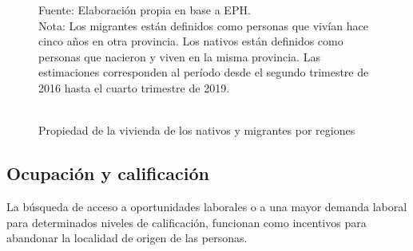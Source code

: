 \documentclass[12pt,a4paper]{article}
\begin{document}
\begin{figure}[htbp!]
\begin{center}
\caption{\\Propiedad de la vivienda de los nativos y migrantes por regiones}
\label{figure:vivienda_mig}
 
\end{center}
\begin{flushleft}
\begin{scriptsize}
Fuente: Elaboración propia en base a EPH.\\
Nota: Los migrantes están definidos como personas que vivían hace cinco años en otra provincia. Los nativos están definidos como personas que nacieron y viven en la misma provincia. Las estimaciones corresponden al período desde el segundo trimestre de 2016 hasta el cuarto trimestre de 2019.\\
\end{scriptsize}
\end{flushleft}
\end{figure}
 


% 
\subsection{Ocupación y calificación}
La búsqueda de acceso a oportunidades laborales o a una mayor demanda laboral para determinados niveles de calificación, funcionan como incentivos para abandonar la localidad de origen de las personas.
\end{document}
